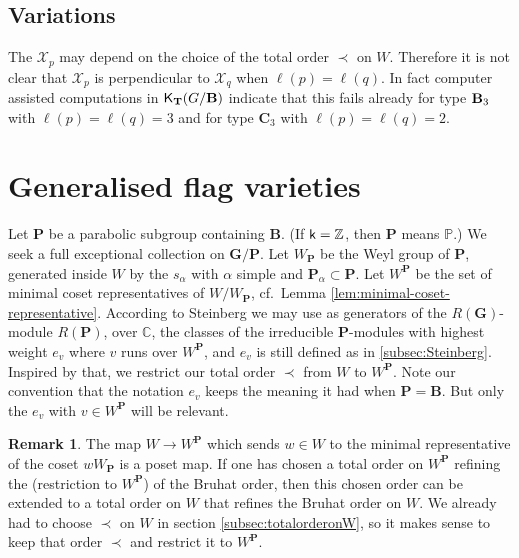\documentclass[sn-mathphys-num]{sn-jnl}%
\newcommand{\tX}{{\mathcal X}}
\newcommand{\sk}{{\sf k}}
\newcommand{\sK}{{\sf K}}
\newcommand{\Z}{{\mathbb Z}}
\newcommand{\cC}{{\mathbb C}}
\newcommand{\Cc}{\mathbf C}
\newcommand{\bg}{\mathbf G}
\newcommand{\fb}{\mathbf B}
\newcommand{\bt}{\mathbf T}
\newcommand{\bp}{\mathbf P}
\theoremstyle{definition}
\newtheorem{remark}[theorem]{Remark}
\begin{document}
\subsection{Variations} 

The $\tX_p$ may depend on the choice of the total order $\prec$
on $W$. Therefore it is not clear that $\tX_p$ is perpendicular to
$\tX_q$ when $\ell(p)=\ell(q)$.
In fact computer assisted computations in $\sK_ {\bt}( G /{\fb})$ indicate 
that this fails already for type ${\bf B}_3$ with $\ell(p)=\ell(q)=3$ and for type ${\Cc}_3$ with $\ell(p)=\ell(q)=2$.


\section{Generalised flag varieties}\label{sec:caseP}

Let $\bp$ be a parabolic subgroup containing $\fb$. (If $\sk=\Z$, then $\bp$ means $\mathbb P$.)
We seek a full exceptional collection on $\bg/\bp$.
Let $W_\bp$ be the Weyl group of $\bp$,
generated inside $W$ by the $s_\alpha$ with $\alpha$ simple and
$\bp_\alpha\subset \bp$.
Let $W^\bp$ be the set of minimal coset representatives of $W/W_\bp$, cf.\  Lemma \ref{lem:minimal-coset-representative}. 
According to Steinberg \cite{St} we may use as generators of  the $R(\bg)$-module $R(\bp)$, over $\cC$, 
the classes of the
irreducible $\bp$-modules with highest weight $e_v$ where $v$
runs over $W^\bp$, and $e_v$ is still defined as in \ref{subsec:Steinberg}. Inspired by that,
we restrict our total order $\prec$ from $W$ to $W^\bp$.
Note our convention that the notation $e_v$ keeps the meaning it had when $\bp=\fb$. But  only the $e_v$ with $v\in W^\bp$ will be relevant.
\begin{remark}The map $W\to W^\bp$ which sends $w\in W$ to the minimal representative of the coset $wW_\bp$ is a poset map.
If one has chosen a total order on $W^\bp$ refining the (restriction to $W^\bp$) of the Bruhat order, then this
chosen order can be extended to
a total order on $W$ that refines the Bruhat order on $W$. We already had to choose $\prec$ on $W$ in section \ref{subsec:totalorderonW}, so it makes sense to keep that order $\prec$ and restrict it to $W^\bp$.
\end{remark}
\end{document}
